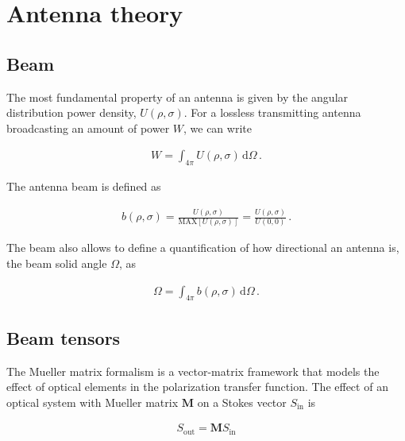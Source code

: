 \documentclass[a4paper,fleqn]{cas-dc}\sloppy
\begin{document}
\section{Antenna theory}

\subsection{Beam}

The most fundamental property of an antenna is given by the angular distribution power density, $U(\rho,\sigma)$. For a lossless transmitting antenna broadcasting an amount of power $W$, we can write

\begin{equation}
\begin{aligned}
W = \int_{4\pi} U(\rho,\sigma) \, \mathrm{d} \Omega \, .
\end{aligned}
\end{equation}

\noindent
The antenna beam is defined as

\begin{equation}
\begin{aligned}
b(\rho, \sigma) = \frac{ U(\rho, \sigma) }{ \mathrm{MAX}\left[ U(\rho,\sigma) \right] }  =  \frac{ U(\rho, \sigma) }{ U(0,0) } \, .
\end{aligned}
\label{eq::beam_def}
\end{equation}

\noindent
The beam also allows to define a quantification of how directional an antenna is, the beam solid angle $\Omega$, as

\begin{equation}
\begin{aligned}
\Omega = \int_{4\pi} b(\rho,\sigma) \, \mathrm{d} \Omega \, .
\end{aligned}
\label{eq::omega_def}
\end{equation}

\subsection{Beam tensors}

The Mueller matrix formalism is a vector-matrix framework that models the effect of optical elements in the polarization transfer function. The effect of an optical system with Mueller matrix $\mathbf{M}$ on a Stokes vector $S_{\mathrm{in}}$ is 

\begin{equation}
\begin{aligned}
S_{\mathrm{out}} = \mathbf{M} S_{\mathrm{in}}
\end{aligned}
\end{equation}
\end{document}
